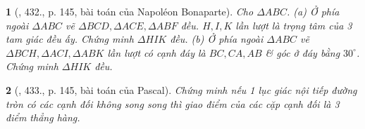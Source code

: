 \documentclass{article}
\newtheorem{baitoan}{}
\begin{document}
\begin{baitoan}[\cite{Binh_Toan_9_tap_2}, 432., p. 145, bài toán của Napol\'eon Bonaparte]
	Cho $\Delta ABC$. (a) Ở phía ngoài $\Delta ABC$ vẽ $\Delta BCD,\Delta ACE,\Delta ABF$ đều. $H,I,K$ lần lượt là trọng tâm của 3 tam giác đều ấy. Chứng minh $\Delta HIK$ đều. (b) Ở phía ngoài $\Delta ABC$ vẽ $\Delta BCH,\Delta ACI,\Delta ABK$ lần lượt có cạnh đáy là $BC,CA,AB$ \& góc ở đáy bằng $30^\circ$. Chứng minh $\Delta HIK$ đều.
\end{baitoan}

\begin{baitoan}[\cite{Binh_Toan_9_tap_2}, 433., p. 145, bài toán của Pascal]
	Chứng minh nếu 1 lục giác nội tiếp đường tròn có các cạnh đối không song song thì giao điểm của các cặp cạnh đối là 3 điểm thẳng hàng.
\end{baitoan}


\printbibliography[heading=bibintoc]
\end{document}
